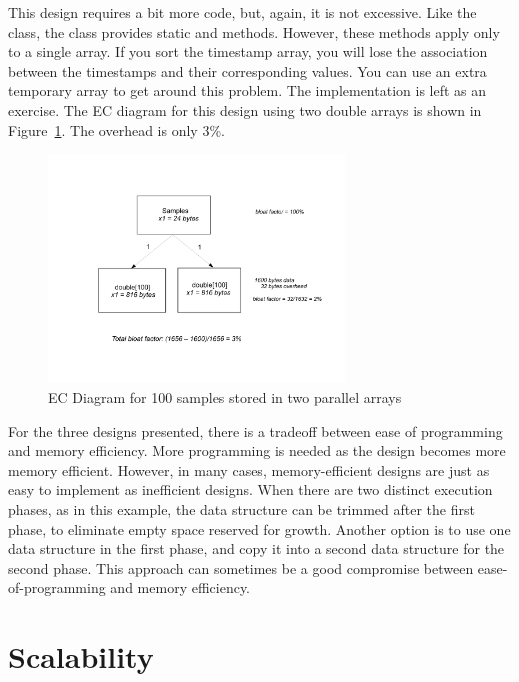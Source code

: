 This design requires a bit more code, but, again, it is not excessive. Like the
 class, the  class provides static 
and   methods. However, these methods apply only to a single
array. If you sort the timestamp array, you will lose the association between
the timestamps and their corresponding values. You can use an extra temporary
array to get around this problem. The implementation is left as an exercise. The
EC diagram for this design using two double arrays is shown in
Figure~\ref{fig:content-schematic-arrays-doubles}. The overhead is only 3\%.

\begin{figure}
  \centering
  \includegraphics[width=0.7\textwidth]{part1/Figures/memoryhealth/array-doubles}
  \caption{EC Diagram for 100 samples stored in two parallel arrays}
  \label{fig:content-schematic-arrays-doubles}
\end{figure}

For the three designs presented, there is a tradeoff between ease of programming
and memory efficiency. More programming is needed as the design becomes more
memory efficient. However, in many cases, memory-efficient designs are just as
easy to implement as inefficient designs. When there are two distinct execution
phases, as in this example, the data structure can be trimmed after the first
phase, to eliminate empty space reserved for growth. Another option is to use
one data structure in the first phase, and copy it into a second data structure
for the second phase. This approach can sometimes be a good compromise between
ease-of-programming and memory efficiency.
 
\section{Scalability}
\label{sec:scalability}

